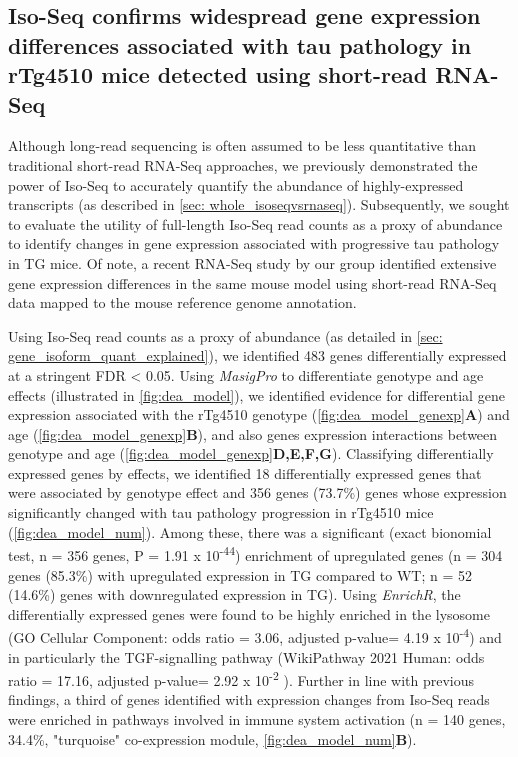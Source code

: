 \subsection{Iso-Seq confirms widespread gene expression differences associated with tau pathology in rTg4510 mice detected using short-read RNA-Seq}
\label{ch5: diffgeneexp}
Although long-read sequencing is often assumed to be less quantitative than traditional short-read RNA-Seq approaches, we previously demonstrated the power of Iso-Seq to accurately quantify the abundance of highly-expressed transcripts (as described in \cref{sec: whole_isoseqvsrnaseq}). Subsequently, we sought to evaluate the utility of full-length Iso-Seq read counts as a proxy of abundance to identify changes in gene expression associated with progressive tau pathology in TG mice. Of note, a recent RNA-Seq study by our group identified extensive gene expression differences in the same mouse model using short-read RNA-Seq data mapped to the mouse reference genome annotation\cite{Castanho2020}.

Using Iso-Seq read counts as a proxy of abundance (as detailed in \cref{sec: gene_isoform_quant_explained}), we identified 483 genes differentially expressed at a stringent FDR < 0.05. Using \textit{MasigPro} to differentiate genotype and age effects (illustrated in \cref{fig:dea_model}), we identified evidence for differential gene expression associated with the rTg4510 genotype (\cref{fig:dea_model_genexp}\textbf{A}) and age (\cref{fig:dea_model_genexp}\textbf{B}), and also genes expression interactions between genotype and age (\cref{fig:dea_model_genexp}\textbf{D,E,F,G}). Classifying differentially expressed genes by effects, we identified 18 differentially expressed genes that were associated by genotype effect and 356 genes (73.7\%) genes whose expression significantly changed with tau pathology progression in rTg4510 mice (\cref{fig:dea_model_num}). Among these, there was a significant (exact bionomial test, n = 356 genes, P = 1.91 x 10\textsuperscript{-44}) enrichment of upregulated genes (n = 304 genes (85.3\%) with upregulated expression in TG compared to WT; n = 52 (14.6\%) genes with downregulated expression in TG). Using \textit{EnrichR}, the differentially expressed genes were found to be highly enriched in the lysosome (GO Cellular Component: odds ratio = 3.06, adjusted p-value= 4.19 x 10\textsuperscript{-4}) and in particularly the TGF-\textbeta signalling pathway (WikiPathway 2021 Human: odds ratio = 17.16, adjusted p-value= 2.92 x 10\textsuperscript{-2} ). Further in line with previous findings, a third of genes identified with expression changes from Iso-Seq reads were enriched in pathways involved in immune system activation (n = 140 genes, 34.4\%, "turquoise" co-expression module\cite{Castanho2020}, \cref{fig:dea_model_num}\textbf{B}). 

